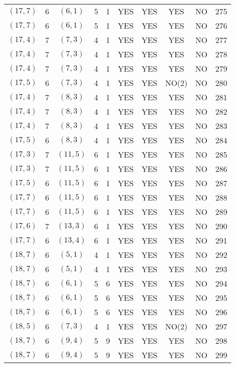 \begin{longtable}{|c|c|c|c|c|c|c|c|c|c|}
$(17, 7)$ & 6 & $(6, 1)$ & 5 & 1 & YES & YES & YES & NO & 275\\
$(17, 7)$ & 6 & $(6, 1)$ & 5 & 1 & YES & YES & YES & NO & 276\\
$(17, 4)$ & 7 & $(7, 3)$ & 4 & 1 & YES & YES & YES & NO & 277\\
$(17, 4)$ & 7 & $(7, 3)$ & 4 & 1 & YES & YES & YES & NO & 278\\
$(17, 4)$ & 7 & $(7, 3)$ & 4 & 1 & YES & YES & YES & NO & 279\\
$(17, 5)$ & 6 & $(7, 3)$ & 4 & 1 & YES & YES & NO(2) & NO & 280\\
$(17, 4)$ & 7 & $(8, 3)$ & 4 & 1 & YES & YES & YES & NO & 281\\
$(17, 4)$ & 7 & $(8, 3)$ & 4 & 1 & YES & YES & YES & NO & 282\\
$(17, 4)$ & 7 & $(8, 3)$ & 4 & 1 & YES & YES & YES & NO & 283\\
$(17, 5)$ & 6 & $(8, 3)$ & 4 & 1 & YES & YES & YES & NO & 284\\
$(17, 3)$ & 7 & $(11, 5)$ & 6 & 1 & YES & YES & YES & NO & 285\\
$(17, 3)$ & 7 & $(11, 5)$ & 6 & 1 & YES & YES & YES & NO & 286\\
$(17, 5)$ & 6 & $(11, 5)$ & 6 & 1 & YES & YES & YES & NO & 287\\
$(17, 7)$ & 6 & $(11, 5)$ & 6 & 1 & YES & YES & YES & NO & 288\\
$(17, 7)$ & 6 & $(11, 5)$ & 6 & 1 & YES & YES & YES & NO & 289\\
$(17, 6)$ & 7 & $(13, 3)$ & 6 & 1 & YES & YES & YES & NO & 290\\
$(17, 7)$ & 6 & $(13, 4)$ & 6 & 1 & YES & YES & YES & NO & 291\\
$(18, 7)$ & 6 & $(5, 1)$ & 4 & 1 & YES & YES & YES & NO & 292\\
$(18, 7)$ & 6 & $(5, 1)$ & 4 & 1 & YES & YES & YES & NO & 293\\
$(18, 7)$ & 6 & $(6, 1)$ & 5 & 6 & YES & YES & YES & NO & 294\\
$(18, 7)$ & 6 & $(6, 1)$ & 5 & 6 & YES & YES & YES & NO & 295\\
$(18, 7)$ & 6 & $(6, 1)$ & 5 & 6 & YES & YES & YES & NO & 296\\
$(18, 5)$ & 6 & $(7, 3)$ & 4 & 1 & YES & YES & NO(2) & NO & 297\\
$(18, 7)$ & 6 & $(9, 4)$ & 5 & 9 & YES & YES & YES & NO & 298\\
$(18, 7)$ & 6 & $(9, 4)$ & 5 & 9 & YES & YES & YES & NO & 299\\

\end{longtable}
